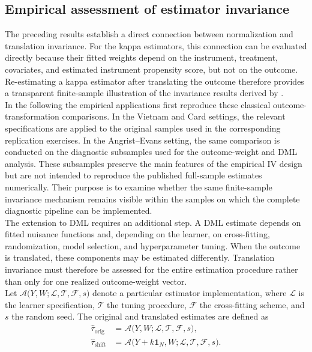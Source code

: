 \documentclass[12pt, a4paper, oneside]{article}
\theoremstyle{plain}
\theoremstyle{definition}
\begin{document}
\subsection{Empirical assessment of estimator invariance}
\label{subsec:full_pipeline_invariance}

The preceding results establish a direct connection between normalization and
translation invariance. For the kappa estimators, this connection can be evaluated
directly because their fitted weights depend on the instrument, treatment, covariates,
and estimated instrument propensity score, but not on the outcome. Re-estimating a
kappa estimator after translating the outcome therefore provides a transparent
finite-sample illustration of the invariance results derived by
\citet{sloczynski2025abadie}.\\
In the following the empirical applications first reproduce these classical outcome-transformation
comparisons. In the Vietnam and Card settings, the relevant specifications are applied
to the original samples used in the corresponding replication exercises. In the
Angrist--Evans setting, the same comparison is conducted on the diagnostic subsamples
used for the outcome-weight and DML analysis. These subsamples preserve the main
features of the empirical IV design but are not intended to reproduce the published
full-sample estimates numerically. Their purpose is to examine whether the same
finite-sample invariance mechanism remains visible within the samples on which the
complete diagnostic pipeline can be implemented.\\
The extension to DML requires an additional step. A DML estimate depends on fitted
nuisance functions and, depending on the learner, on cross-fitting, randomization, model
selection, and hyperparameter tuning. When the outcome is translated, these components
may be estimated differently. Translation invariance must therefore be assessed for the
entire estimation procedure rather than only for one realized outcome-weight vector.\\
Let $    \mathcal A
    \bigl(
        Y,W;
        \mathcal L,
        \mathcal T,
        \mathcal F,
        s
    \bigr)
$
denote a particular estimator implementation, where \(\mathcal L\) is the learner
specification, \(\mathcal T\) the tuning procedure, \(\mathcal F\) the cross-fitting
scheme, and \(s\) the random seed. The original and translated estimates are defined as
\begin{align}
    \widehat{\tau}_{\mathrm{orig}}
    &=
    \mathcal A
    \bigl(
        Y,W;
        \mathcal L,
        \mathcal T,
        \mathcal F,
        s
    \bigr), \\
    \widehat{\tau}_{\mathrm{shift}}
    &=
    \mathcal A
    \bigl(
        Y+k\mathbf 1_N,W;
        \mathcal L,
        \mathcal T,
        \mathcal F,
        s
    \bigr).
\end{align}
\end{document}
